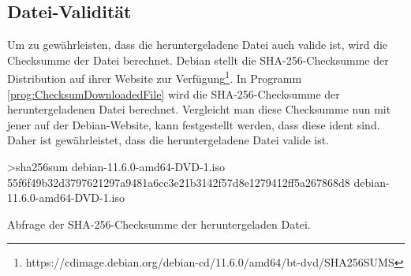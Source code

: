 \subsection{Datei-Validität}
Um zu gewährleisten, dass die heruntergeladene Datei auch valide ist, wird die Check\-summe der Datei berechnet. Debian stellt die SHA-256-Checksumme der Distribution auf ihrer Website zur Verfügung\footnote[1]{https://cdimage.debian.org/debian-cd/11.6.0/amd64/bt-dvd/SHA256SUMS}. In Programm \ref{prog:ChecksumDownloadedFile} wird die SHA-256-Checksumme der heruntergeladenen Datei berechnet. Vergleicht man diese Checksumme nun mit jener auf der Debian-Website, kann festgestellt werden, dass diese ident sind. Daher ist gewährleistet, dass die heruntergeladene Datei valide ist.



\begin{program}
    \begin{GenericCode}[numbers=none]
>sha256sum debian-11.6.0-amd64-DVD-1.iso
55f6f49b32d3797621297a9481a6cc3e21b3142f57d8e1279412ff5a267868d8 debian-11.6.0-amd64-DVD-1.iso
\end{GenericCode}
\caption{Abfrage der SHA-256-Checksumme der heruntergeladen Datei.}
\label{prog:ChecksumDownloadedFile}
\end{program}

